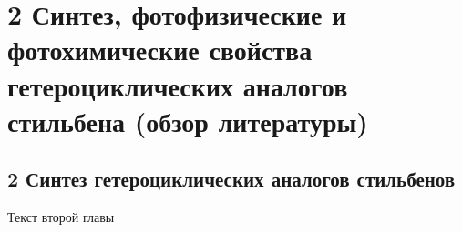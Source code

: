 \chapter{2 Синтез, фотофизические и фотохимические свойства гетероциклических аналогов стильбена (обзор литературы)} \label{chapt2}

	\section{2 Синтез гетероциклических аналогов стильбенов}\label{sect2_1}
	
		Текст второй главы
		